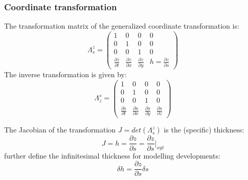 \subsubsection{Coordinate transformation}
The transformation matrix of the generalized coordinate transformation is:
\begin{equation}
    \displaystyle
    \Lambda^z_s=
    \begin{pmatrix}
    1 & 0 & 0 & 0 \\
    0 & 1 & 0 & 0 \\
    0 & 0 & 1 & 0 \\
    \frac{\partial z}{\partial t} & \frac{\partial z}{\partial x}
    & \frac{\partial z}{\partial y} & h=\frac{\partial z}{\partial s}
    \end{pmatrix}
\end{equation}
The inverse transformation is given by:
\begin{equation}
    \displaystyle
    \Lambda_z^s=
    \begin{pmatrix}
    1 & 0 & 0 & 0 \\
    0 & 1 & 0 & 0 \\
    0 & 0 & 1 & 0 \\
    \frac{\partial s}{\partial t} & \frac{\partial s}{\partial x}
    & \frac{\partial s}{\partial y} & \frac{\partial s}{\partial z}
    \end{pmatrix}
\end{equation}

The Jacobian of the transformation $J=det(\Lambda^z_s)$ is the (specific) thickness:
\begin{equation}
 \displaystyle
 J=h=\frac{\partial z}{\partial s}=\frac{\partial z}{\partial s}\bigg\vert_{xyt}
\end{equation}
\cite{griffies_fundamentals_2004} further define the infinitesimal  thickness for modelling developments:
\begin{equation}
 \displaystyle
 \delta h=\frac{\partial z}{\partial s} \delta s
\end{equation}


